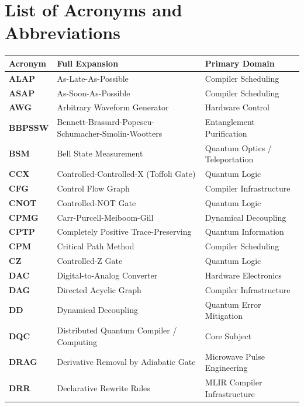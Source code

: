 \chapter*{List of Acronyms and Abbreviations}


\begin{tabularx}{\textwidth}{llX}
    \toprule
    \textbf{Acronym} & \textbf{Full Expansion} & \textbf{Primary Domain} \\
    \midrule
    \textbf{ALAP} & As-Late-As-Possible & Compiler Scheduling \\
    \textbf{ASAP} & As-Soon-As-Possible & Compiler Scheduling \\
    \textbf{AWG} & Arbitrary Waveform Generator & Hardware Control \\
    \textbf{BBPSSW} & Bennett-Brassard-Popescu-Schumacher-Smolin-Wootters & Entanglement Purification \\
    \textbf{BSM} & Bell State Measurement & Quantum Optics / Teleportation \\
    \textbf{CCX} & Controlled-Controlled-X (Toffoli Gate) & Quantum Logic \\
    \textbf{CFG} & Control Flow Graph & Compiler Infrastructure \\
    \textbf{CNOT} & Controlled-NOT Gate & Quantum Logic \\
    \textbf{CPMG} & Carr-Purcell-Meiboom-Gill & Dynamical Decoupling \\
    \textbf{CPTP} & Completely Positive Trace-Preserving & Quantum Information \\
    \textbf{CPM} & Critical Path Method & Compiler Scheduling \\
    \textbf{CZ} & Controlled-Z Gate & Quantum Logic \\
    \textbf{DAC} & Digital-to-Analog Converter & Hardware Electronics \\
    \textbf{DAG} & Directed Acyclic Graph & Compiler Infrastructure \\
    \textbf{DD} & Dynamical Decoupling & Quantum Error Mitigation \\
    \textbf{DQC} & Distributed Quantum Compiler / Computing & Core Subject \\
    \textbf{DRAG} & Derivative Removal by Adiabatic Gate & Microwave Pulse Engineering \\
    \textbf{DRR} & Declarative Rewrite Rules & MLIR Compiler Infrastructure \\

\end{tabularx}
